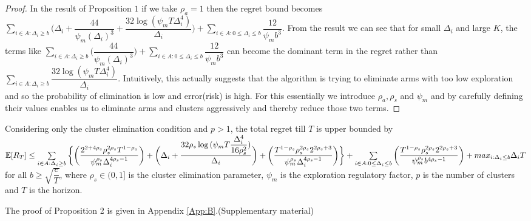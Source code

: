 \begin{proof}
In the result of Proposition $1$ if we take $\rho_{a}=1$ then the regret bound becomes $ \sum\limits_{i\in A:\Delta_{i}\geq b}\bigg(\Delta_{i} + \dfrac{44}{\psi_{m}(\Delta_{i})^{3}} + \dfrac{32\log{(\psi_{m}T\Delta_{i}^{4})}}{\Delta_{i}}\bigg) + \sum\limits_{i\in A:0\leq\Delta_{i}\leq b}\dfrac{12}{\psi_{m}b^{3}}$. From the result we can see that for small $\Delta_{i}$ and large $K$, the terms like $ \sum_{i\in A:\Delta_{i}\geq b}\bigg(\dfrac{44}{\psi_{m}(\Delta_{i})^{3}}\bigg) + \sum_{i\in A:0\leq\Delta_{i}\leq b}\dfrac{12}{\psi_{m}b^{3}}$ can become the dominant term in the regret rather than $\sum_{i\in A:\Delta_{i}\geq b}\dfrac{32\log{(\psi_{m}T\Delta_{i}^{4})}}{\Delta_{i}}$. Intuitively, this actually suggests that the algorithm is trying to eliminate arms with too low exploration and so the probability of elimination is low and error(risk) is high. For this essentially we introduce $\rho_{a},\rho_{s}$ and $\psi_{m}$ and by carefully defining their values enables us to eliminate arms and clusters aggressively and thereby reduce those two terms. 
\end{proof}

\begin{proposition}
\label{proofSketch:Prop:2}
Considering only the cluster elimination condition and $p>1$, the total regret till $T$ is upper bounded by $\mathbb{E} [R_{T}]\leq \sum\limits_{i\in A:\Delta_{i}\geq b}\bigg\lbrace \bigg(\dfrac{2^{2+4\rho_{s}}\rho_{s}^{2\rho_{s}}T^{1-\rho_{s}}}{\psi_{m}^{\rho_{s}}\Delta_{i}^{4\rho_{s}-1}}\bigg) + \bigg(\Delta_{i}+\dfrac{32\rho_{s}\log{(\psi_{m}T\dfrac{\Delta_{i}^{4}}{16\rho_{s}^{2}})}}{\Delta_{i}}\bigg)  +  \bigg(\dfrac{T^{1-\rho_{s}}\rho_{s}^{2\rho_{s}}2^{2\rho_{s}+3}}{\psi_{m}^{\rho_{s}}\Delta_{i}^{4\rho_{s} -1}} \bigg)\bigg \rbrace +\sum\limits_{i\in A:0\leq\Delta_{i}\leq b}\bigg(\dfrac{T^{1-\rho_{s}}\rho_{s}^{2\rho_{s}}2^{2\rho_{s}+3}}{\psi_{m}^{\rho_{s}}b^{4\rho_{s} -1}} \bigg) + max_{i:\Delta_{i}\leq b}\Delta_{i}T$ for all $b\geq \sqrt{\dfrac{e}{T}}$, where $\rho_{s}\in (0,1]$ is the cluster elimination parameter, $\psi_{m}$ is the exploration regulatory factor, $p$ is the number of clusters and $T$ is the horizon.
\end{proposition}

	The proof of Proposition 2 is given in Appendix \ref{App:B}.(Supplementary material)
